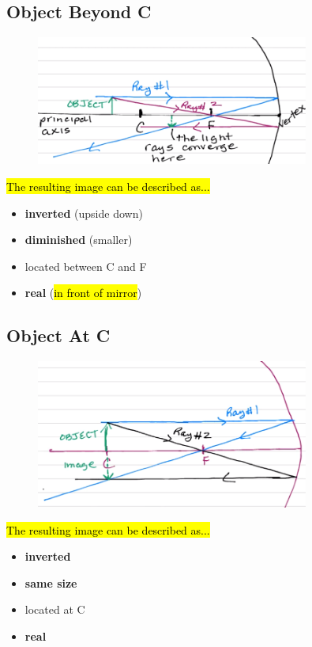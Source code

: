 \documentclass[a4paper,12pt]{article}
\begin{document}
\subsection{Object Beyond C}
\begin{figure}[H]
    \centering
    \includegraphics[width=0.8\textwidth]{concave-mirror-beyondC}
\end{figure}
\hl{The resulting image can be described as...}
\begin{itemize}
    \item{\textbf{inverted} (upside down)}
    \item{\textbf{diminished} (smaller)}
    \item{located between C and F}
    \item{\textbf{real} (\hl{in front of mirror})}
\end{itemize}

\subsection{Object At C}
\begin{figure}[H]
    \centering
    \includegraphics[width=0.8\textwidth]{concave-mirror-atC}
\end{figure}
\hl{The resulting image can be described as...}
\begin{itemize}
    \item{\textbf{inverted}}
    \item{\textbf{same size}}
    \item{located at C}
    \item{\textbf{real}}
\end{itemize}
\end{document}
